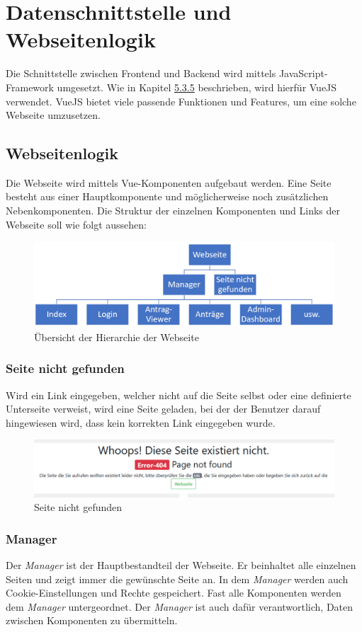 \section{Datenschnittstelle und Webseitenlogik}
Die Schnittstelle zwischen Frontend und Backend wird mittels JavaScript-Framework umgesetzt. Wie in Kapitel \hyperref[sec:rfoster_fazit]{5.3.5} beschrieben, wird hierfür VueJS verwendet. VueJS bietet viele passende Funktionen und Features, um  eine solche Webseite umzusetzen.
\subsection{Webseitenlogik}
\label{sec:webseitenlogik}
Die Webseite wird mittels Vue-Komponenten aufgebaut werden. Eine Seite besteht aus einer Hauptkomponente und möglicherweise noch zusätzlichen Nebenkomponenten. Die Struktur der einzelnen Komponenten und Links der Webseite soll wie folgt aussehen:
\begin{figure}[H]
	\centering
	\includegraphics[width=0.8\linewidth]{images/Webseite_hierarchie}
	\caption[Hierarchie der Webseite]{Übersicht der Hierarchie der Webseite}
	\label{fig:webseitehierachie}
\end{figure}

\subsubsection{Seite nicht gefunden}
\label{sec:not_found}
Wird ein Link eingegeben, welcher nicht auf die Seite selbst oder eine definierte Unterseite verweist, wird eine Seite geladen, bei der der Benutzer darauf hingewiesen wird, dass kein korrekten Link eingegeben wurde.
\begin{figure}[H]
	\centering
	\includegraphics[width=0.6\linewidth]{images/page_not_found}
	\caption[Seite nicht gefunden]{Seite nicht gefunden}
	\label{fig:pagenotfound}
\end{figure}

\subsubsection{Manager}
Der \textit{Manager} ist der Hauptbestandteil der Webseite. Er beinhaltet alle einzelnen Seiten und zeigt immer die gewünschte Seite an. In dem \textit{Manager} werden auch Cookie-Einstellungen und Rechte gespeichert. Fast alle Komponenten werden dem \textit{Manager} untergeordnet. Der \textit{Manager} ist auch dafür verantwortlich, Daten zwischen Komponenten zu übermitteln.


